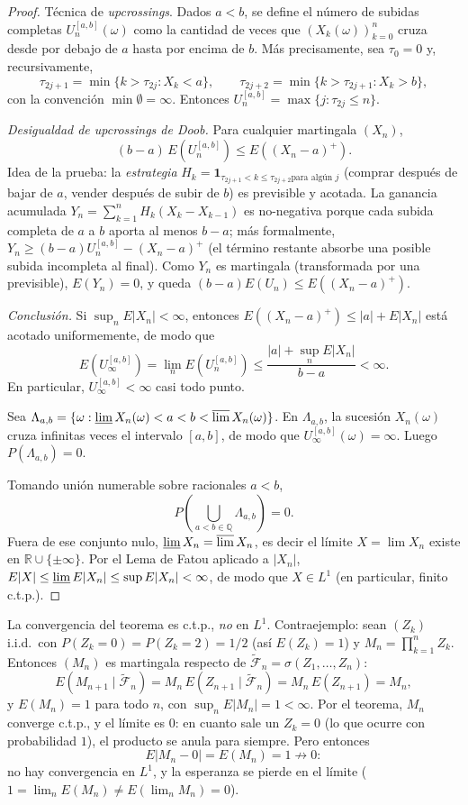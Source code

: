 \documentclass[11pt, a4paper]{article}
\begin{document}
\begin{proof}
Técnica de \emph{upcrossings}. Dados $a < b$, se define el número de subidas completas
$U_n^{[a,b]}(\omega)$ como la cantidad de veces que $(X_k(\omega))_{k=0}^n$ cruza desde por debajo
de $a$ hasta por encima de $b$. Más precisamente, sea $\tau_0 = 0$ y, recursivamente,
$$ \tau_{2j+1} = \min\{k > \tau_{2j} : X_k < a\}, \qquad \tau_{2j+2} = \min\{k > \tau_{2j+1} : X_k
> b\}, $$
con la convención $\min \emptyset = \infty$. Entonces $U_n^{[a,b]} = \max\{j : \tau_{2j} \le n\}$.

\textit{Desigualdad de upcrossings de Doob.} Para cualquier martingala $(X_n)$,
$$ (b - a) \, E(U_n^{[a,b]}) \le E((X_n - a)^+). $$
Idea de la prueba: la \emph{estrategia} $H_k = \mathbf{1}_{\tau_{2j+1} < k \le \tau_{2j+2} \text{
para algún } j}$ (comprar después de bajar de $a$, vender después de subir de $b$) es
previsible y acotada. La ganancia acumulada $Y_n = \sum_{k=1}^n H_k(X_k - X_{k-1})$ es
no-negativa porque cada subida completa de $a$ a $b$ aporta al menos $b - a$; más
formalmente, $Y_n \ge (b - a) U_n^{[a,b]} - (X_n - a)^+$ (el término restante absorbe una
posible subida incompleta al final). Como $Y_n$ es martingala (transformada por una previsible),
$E(Y_n) = 0$, y queda $(b - a) E(U_n) \le E((X_n - a)^+)$.

\textit{Conclusión.} Si $\sup_n E|X_n| < \infty$, entonces $E((X_n - a)^+) \le |a| + E|X_n|$
está
acotado uniformemente, de modo que
$$ E(U_\infty^{[a,b]}) = \lim_n E(U_n^{[a,b]}) \le \frac{|a| + \sup_n E|X_n|}{b - a} < \infty. $$
En particular, $U_\infty^{[a,b]} < \infty$ casi todo punto.

Sea $\Lambda_{a,b} = \{\omega : \varliminf X_n(\omega) < a < b < \varlimsup X_n(\omega)\}$.
En $\Lambda_{a,b}$, la sucesión $X_n(\omega)$ cruza infinitas veces el intervalo $[a, b]$, de modo
que $U_\infty^{[a,b]}(\omega) = \infty$. Luego $P(\Lambda_{a,b}) = 0$.

Tomando unión numerable sobre racionales $a < b$,
$$ P\!\left(\bigcup_{a < b \in \mathbb{Q}} \Lambda_{a,b}\right) = 0. $$
Fuera de ese conjunto nulo, $\varliminf X_n = \varlimsup X_n$, es decir el límite
$X = \lim X_n$ existe en $\mathbb{R} \cup \{\pm\infty\}$. Por el Lema de Fatou aplicado a $|X_n|$,
$E|X| \le \varliminf E|X_n| \le \sup E|X_n| < \infty$, de modo que $X \in L^1$ (en particular,
finito c.t.p.).
\end{proof}

\obs La convergencia del teorema es c.t.p., \emph{no} en $L^1$. Contraejemplo: sean $(Z_k)$
i.i.d.\ con $P(Z_k = 0) = P(Z_k = 2) = 1/2$ (así $E(Z_k) = 1$) y $M_n = \prod_{k=1}^n Z_k$.
Entonces $(M_n)$ es martingala respecto de $\widetilde{\mathcal{F}}_n = \sigma(Z_1, \dots,
Z_n)$:
$$ E(M_{n+1} \mid \widetilde{\mathcal{F}}_n) = M_n \, E(Z_{n+1} \mid
\widetilde{\mathcal{F}}_n) = M_n \, E(Z_{n+1}) = M_n, $$
y $E(M_n) = 1$ para todo $n$, con $\sup_n E|M_n| = 1 < \infty$. Por el teorema, $M_n$ converge
c.t.p., y el límite es $0$: en cuanto sale un $Z_k = 0$ (lo que ocurre con probabilidad $1$),
el producto se anula para siempre. Pero entonces
$$ E|M_n - 0| = E(M_n) = 1 \not\to 0: $$
no hay convergencia en $L^1$, y la esperanza se pierde en el límite
($1 = \lim_n E(M_n) \ne E(\lim_n M_n) = 0$).
\end{document}
